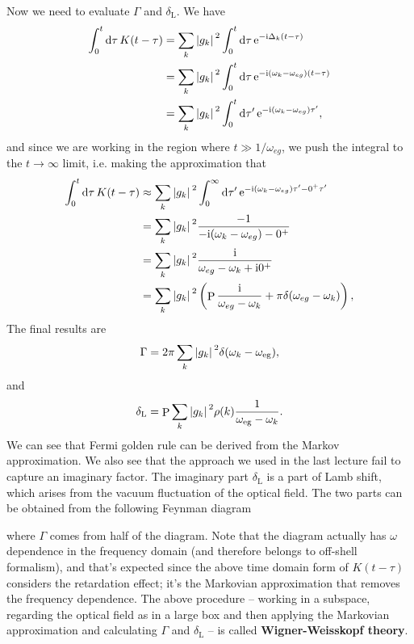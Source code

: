 \documentclass[hyperref, a4paper]{article}
\DeclareMathOperator{\primevalue}{P}
\newcommand*{\ii}{\mathrm{i}}
\newcommand*{\ee}{\mathrm{e}}
\newcommand*{\concept}[1]{{\textbf{#1}}}
\begin{document}
Now we need to evaluate $\Gamma$ and $\delta_\text{L}$. We have 
\[
    \begin{aligned}
        \int_0^t \dd{\tau} K(t - \tau) &= \sum_k \abs*{g_k}^2 \int_0^t \dd{\tau} \ee^{- \ii \Delta_k (t - \tau)} \\
        &= \sum_k \abs*{g_k}^2 \int_0^t \dd{\tau} \ee^{- \ii (\omega_k - \omega_{eg}) (t - \tau)} \\
        &= \sum_k \abs*{g_k}^2 \int_0^t \dd{\tau'} \ee^{- \ii (\omega_k - \omega_{eg}) \tau' },
    \end{aligned}
\]
and since we are working in the region where $t \gg 1 / \omega_{eg}$, we push the integral to the $t \to \infty$ 
limit, i.e. making the approximation that 
\[
    \begin{aligned}
        \int_0^t \dd{\tau} K(t - \tau) &\approx \sum_k \abs*{g_k}^2 \int_0^\infty \dd{\tau'} \ee^{- \ii (\omega_k - \omega_{eg}) \tau' - 0^+ \tau'} \\
        &= \sum_k \abs*{g_k}^2 \frac{-1}{- \ii (\omega_k - \omega_{eg})  - 0^+ } \\
        &= \sum_k \abs*{g_k}^2 \frac{\ii}{\omega_{eg} - \omega_k + \ii 0^+} \\
        &= \sum_k \abs*{g_k}^2 \left( \primevalue \frac{\ii}{\omega_{eg} - \omega_k } + \pi \delta(\omega_{eg} - \omega_k) \right),
    \end{aligned}
\]
The final results are
\begin{equation}
    \Gamma = 2 \pi \sum_k \abs*{g_k}^2 \delta(\omega_k - \omega_\text{eg}),
    \label{eq:scattering-rate}
\end{equation}
and 
\begin{equation}
    \delta_\text{L} = \primevalue \sum_k \abs*{g_k}^2 \rho(k) \frac{1}{\omega_\text{eg} - \omega_k }.
    \label{eq:phase-shift}
\end{equation}
We can see that Fermi golden rule can be derived from the Markov approximation. We also see that the approach 
we used in the last lecture fail to capture an imaginary factor. The imaginary part $\delta_\text{L}$ is a part 
of Lamb shift, which arises from the vacuum fluctuation of the optical field. The two parts can be obtained 
from the following Feynman diagram 

where $\Gamma$ comes from half of the diagram. 
Note that the diagram actually has $\omega$ dependence 
in the frequency domain (and therefore belongs to off-shell formalism),
and that's expected since the above time domain
form of $K(t - \tau)$ considers the retardation effect; 
it's the Markovian approximation that removes the frequency dependence. 
The above procedure -- working in a subspace, regarding the 
optical field as in a large box and then applying the Markovian approximation and calculating $\Gamma$ and 
$\delta_\text{L}$ -- is called \concept{Wigner-Weisskopf theory}.
\end{document}
